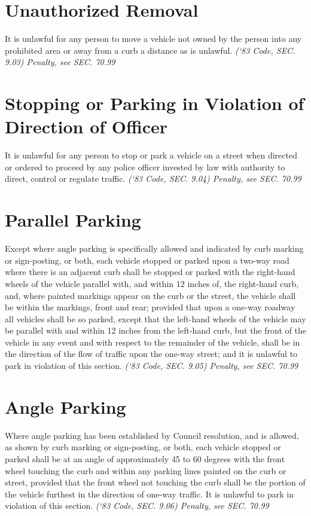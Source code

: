 \section{Unauthorized Removal}
It is unlawful for any person to move a vehicle not owned by the person into any prohibited area or away from a curb a distance as is unlawful.\newline
\emph{(‘83 Code, SEC. 9.03)  Penalty, see SEC. 70.99}

\section{Stopping or Parking in Violation of Direction of Officer}
It is unlawful for any person to stop or park a vehicle on a street when directed or ordered to proceed by any police officer invested by law with authority to direct, control or regulate traffic.\newline
\emph{(‘83 Code, SEC. 9.04)  Penalty, see SEC. 70.99}

\section{Parallel Parking}
Except where angle parking is specifically allowed and indicated by curb marking or sign-posting, or both, each vehicle stopped or parked upon a two-way road where there is an adjacent curb shall be stopped or parked with the right-hand wheels of the vehicle parallel with, and within 12 inches of, the right-hand curb, and, where painted markings appear on the curb or the street, the vehicle shall be within the markings, front and rear; provided that upon a one-way roadway all vehicles shall be so parked, except that the left-hand wheels of the vehicle may be parallel with and within 12 inches from the left-hand curb, but the front of the vehicle in any event and with respect to the remainder of the vehicle, shall be in the direction of the flow of traffic upon the one-way street; and it is unlawful to park in violation of this section.\newline
\emph{(‘83 Code, SEC. 9.05)  Penalty, see SEC. 70.99}

\section{Angle Parking}
Where angle parking has been established by Council resolution, and is allowed, as shown by curb marking or sign-posting, or both, each vehicle stopped or parked shall be at an angle of approximately 45 to 60 degrees with the front wheel touching the curb and within any parking lines painted on the curb or street, provided that the front wheel not touching the curb shall be the portion of the vehicle furthest in the direction of one-way traffic.  It is unlawful to park in violation of this section.\newline
\emph{(‘83 Code, SEC. 9.06)  Penalty, see SEC. 70.99}

